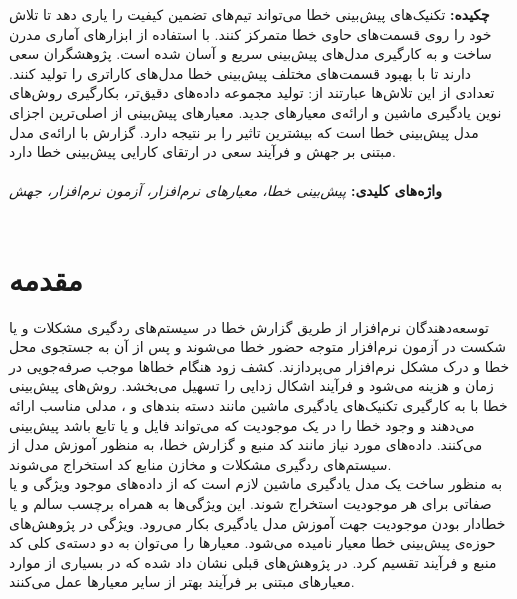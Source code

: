\thispagestyle{empty}
\noindent
\renewcommand*\thesection{\arabic{section}}
\textbf{\large{چکیده:}}
تکنیک‌های پیش‌بینی خطا می‌تواند تیم‌های تضمین کیفیت را یاری دهد تا تلاش خود را  روی قسمت‌های حاوی خطا متمرکز کنند. با استفاده از ابزارهای آماری مدرن  ساخت و به کارگیری مدل‌های پیش‌بینی سریع و آسان شده است. پژوهشگران سعی دارند تا با بهبود قسمت‌های مختلف پیش‌بینی خطا مدل‌های کاراتری را تولید کنند. تعدادی از این تلاش‌ها عبارتند از: ‌تولید مجموعه داده‌های دقیق‌تر، بکارگیری روش‌های نوین یادگیری ماشین و ارائه‌ی معیارهای جدید. معیارهای پیش‌بینی از اصلی‌ترین اجزای مدل پیش‌بینی  خطا است که بیشترین تاثیر را بر نتیجه دارد.  گزارش با‌ ارائه‌ی مدل مبتنی بر جهش و فرآیند سعی در ارتقای کارایی پیش‌بینی خطا دارد. 
\\\\
\textbf{واژه‌های کلیدی:}\textit{ 
پیش‌بینی خطا، معیارهای ‌نرم‌افزار، آزمون ‌نرم‌افزار، جهش
}\\\\
\section{مقدمه}
\label{sec:intro}
  توسعه‌دهندگان نرم‌افزار از طریق گزارش خطا در سیستم‌های ردگیری مشکلات و یا شکست در آزمون نرم‌افزار متوجه حضور خطا می‌شوند و پس از آن به جستجوی محل خطا و درک مشکل  نرم‌افزار می‌پردازند. کشف زود هنگام خطاها موجب صرفه‌جویی در زمان و هزینه می‌شود و فرآیند اشکال زدایی را تسهیل می‌بخشد. روش‌های پیش‌بینی خطا با به کارگیری تکنیک‌های یادگیری ماشین مانند دسته ‌بندهای  و  ، مدلی مناسب ارائه می‌دهند و وجود خطا را در یک موجودیت که می‌تواند فایل و یا تابع باشد پیش‌بینی می‌کنند. داده‌های مورد نیاز مانند کد منبع و گزارش خطا، به منظور آموزش مدل از سیستم‌های ردگیری مشکلات و مخازن منابع کد استخراج می‌شوند. \\
  
 به منظور ساخت یک مدل یادگیری ماشین لازم است که از داده‌های موجود ویژگی و یا صفاتی  برای هر موجودیت استخراج شوند. این ویژگی‌ها به همراه برچسب سالم و یا خطادار بودن موجودیت جهت آموزش مدل یادگیری بکار می‌رود.  ویژگی  در پژوهش‌های حوزه‌ی پیش‌بینی خطا معیار  نامیده می‌شود.  معیارها را می‌توان به دو دسته‌ی کلی کد منبع و فرآیند تقسیم کرد. در پژوهش‌های قبلی نشان داد شده که در بسیاری از موارد معیارهای مبتنی بر فرآیند بهتر از سایر معیارها عمل می‌کنند\cite{rahman2013and}\cite{radjenovic2013software}. \\
 
